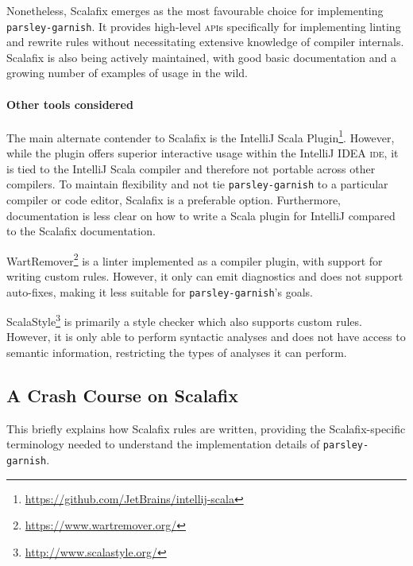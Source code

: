 \documentclass[../../main.tex]{subfiles}
\begin{document}
Nonetheless, Scalafix emerges as the most favourable choice for implementing \texttt{parsley-garnish}.
It provides high-level \textsc{api}s specifically for implementing linting and rewrite rules without necessitating extensive knowledge of compiler internals.
Scalafix is also being actively maintained, with good basic documentation and a growing number of examples of usage in the wild.

\paragraph{Other tools considered}
The main alternate contender to Scalafix is the IntelliJ Scala Plugin\footnote{\url{https://github.com/JetBrains/intellij-scala}}.
However, while the plugin offers superior interactive usage within the IntelliJ IDEA \textsc{ide}, it is tied to the IntelliJ Scala compiler and therefore not portable across other compilers.
To maintain flexibility and not tie \texttt{parsley-garnish} to a particular compiler or code editor, Scalafix is a preferable option.
Furthermore, documentation is less clear on how to write a Scala plugin for IntelliJ compared to the Scalafix documentation.

WartRemover\footnote{\url{https://www.wartremover.org/}} is a linter implemented as a compiler plugin, with support for writing custom rules.
However, it only can emit diagnostics and does not support auto-fixes, making it less suitable for \texttt{parsley-garnish}'s goals.

ScalaStyle\footnote{\url{http://www.scalastyle.org/}} is primarily a style checker which also supports custom rules.
However, it is only able to perform syntactic analyses and does not have access to semantic information, restricting the types of analyses it can perform.


\subsection{A Crash Course on Scalafix}\label{sec:scalafix}
This  briefly explains how Scalafix rules are written,
providing the Scalafix-specific terminology needed to understand the implementation details of \texttt{parsley-garnish}.
\end{document}

